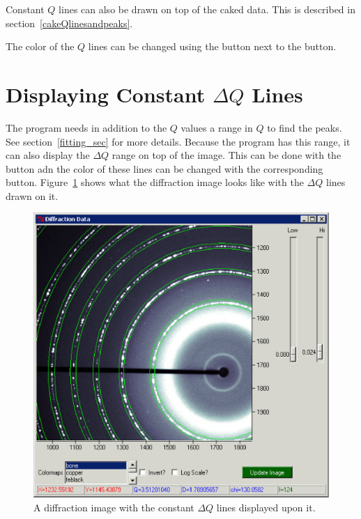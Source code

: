 Constant $Q$ lines can also be drawn on top of the
caked data. This is described in 
section~\ref{cakeQlinesandpeaks}.

The color of the $Q$ lines can be changed using the
 button next to the  
button.

\section{\texorpdfstring{Displaying Constant $\Delta Q$ 
        Lines}{Displaying Constant delta Q Lines}}

The program needs in addition to the $Q$ values
a range in $Q$ to find the peaks. See 
section~\ref{fitting_sec} for more details. Because
the program has this range, it can also display the
$\Delta Q$ range on top of the image.
This can be done with the  button
adn the color of these lines can be changed with the
corresponding  button. 
Figure~\ref{constant_dq_lines_on_diffraction_image}
shows what the diffraction image looks like with
the $\Delta Q$ lines drawn on it.

\begin{figure}
    \centering
    \includegraphics[scale=.75]{figures/constant_dq_lines_on_diffraction_image.eps}
    \caption{A diffraction image with the constant $\Delta Q$
    lines displayed upon it.}
    \label{constant_dq_lines_on_diffraction_image}
\end{figure}


